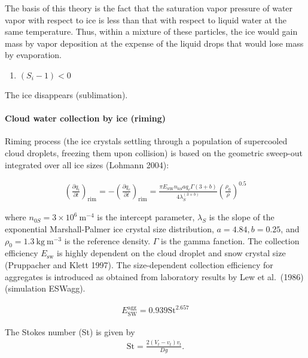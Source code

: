 The basis of this theory is the fact that the saturation vapor pressure
of water vapor with respect to ice is less than that with respect to
liquid water at the same temperature. Thus, within a mixture of these
particles, the ice would gain mass by vapor deposition at the expense of
the liquid drops that would lose mass by evaporation.

\begin{enumerate}
\def\labelenumi{\arabic{enumi}.}
\tightlist
\item
  \((S_i - 1)<0\)
\end{enumerate}

The ice disappears (sublimation).

\hypertarget{cloud-water-collection-by-ice-riming}{%
\paragraph{Cloud water collection by ice
(riming)}\label{cloud-water-collection-by-ice-riming}}

Riming process (the ice crystals settling through a population of
supercooled cloud droplets, freezing them upon collision) is based on
the geometric sweep-out integrated over all ice sizes (Lohmann 2004):

\begin{eqnarray}
\left(\frac{\partial q_i}{\partial t}\right)_{\text {rim}}
=-\left(\frac{\partial q_c}{\partial t}\right)_{\text {rim}}
=\frac{\pi E_{\mathrm{SW}} n_{0S} a q_{c} \Gamma(3+b)}{4 \lambda_{S}^{(3+b)}}\left(\frac{\rho_{0}}{\rho}\right)^{0.5}
\end{eqnarray}

where \(n_{0 S}=3 \times 10^{6} \mathrm{~m}^{-4}\) is the intercept
parameter, \(\lambda_{S}\) is the slope of the exponential
Marshall-Palmer ice crystal size distribution, \(a=4.84, b=0.25\), and
\(\rho_{0}=1.3 \mathrm{~kg} \mathrm{~m}^{-3}\) is the reference density.
\(\Gamma\) is the gamma fanction. The collection efficiency
\(E_{\mathrm{sw}}\) is highly dependent on the cloud droplet and snow
crystal size (Pruppacher and Klett 1997). The size-dependent collection
efficiency for aggregates is introduced as obtained from laboratory
results by Lew et al.~(1986) (simulation ESWagg).

\begin{eqnarray}
E_{\mathrm{SW}}^{\mathrm{agg}}=0.939 \mathrm{St}^{2.657}
\end{eqnarray}

The Stokes number (St) is given by \begin{eqnarray}
\mathrm{St}=\frac{2\left(V_{t}-{v}_{t}\right) {v}_{t}}{D g}.
\end{eqnarray}


